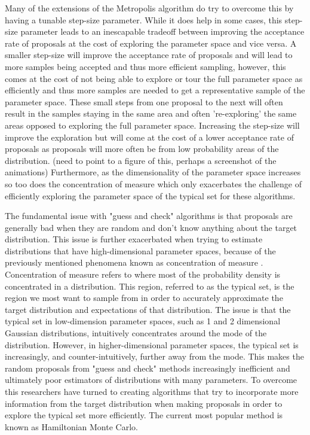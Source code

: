 Many of the extensions of the Metropolis algorithm do try to overcome this by having a tunable step-size parameter. While it does help in some cases, this step-size parameter leads to an inescapable tradeoff between improving the acceptance rate of proposals at the cost of exploring the parameter space and vice versa. A smaller step-size will improve the acceptance rate of proposals and will lead to more samples being accepted and thus more efficient sampling, however, this comes at the cost of not being able to explore or tour the full parameter space as efficiently and thus more samples are needed to get a representative sample of the parameter space. These small steps from one proposal to the next will often result in the samples staying in the same area and often 're-exploring' the same areas opposed to exploring the full parameter space. Increasing the step-size will improve the exploration but will come at the cost of a lower acceptance rate of proposals as proposals will more often be from low probability areas of the distribution. (need to point to a figure of this, perhaps a screenshot of the animations) Furthermore, as the dimensionality of the parameter space increases so too does the concentration of measure which only exacerbates the challenge of efficiently exploring the parameter space of the typical set for these algorithms.

The fundamental issue with "guess and check" algorithms is that proposals are generally bad when they are random and don't know anything about the target distribution. This issue is further exacerbated when trying to estimate distributions that have high-dimensional parameter spaces, because of the previously mentioned phenomena known as concentration of measure \cite{Betancourt2017} \cite{Carpenter2017}. Concentration of measure refers to where most of the probability density is concentrated in a distribution. This region, referred to as the typical set, is the region we most want to sample from in order to accurately approximate the target distribution and expectations of that distribution. The issue is that the typical set in low-dimension parameter spaces, such as 1 and 2 dimensional Gaussian distributions, intuitively concentrates around the mode of the distribution. However, in higher-dimensional parameter spaces, the typical set is increasingly, and counter-intuitively, further away from the mode. This makes the random proposals from "guess and check" methods increasingly inefficient and ultimately poor estimators of distributions with many parameters. To overcome this researchers have turned to creating algorithms that try to incorporate more information from the target distribution when making proposals in order to explore the typical set more efficiently. The current most popular method is known as Hamiltonian Monte Carlo.

